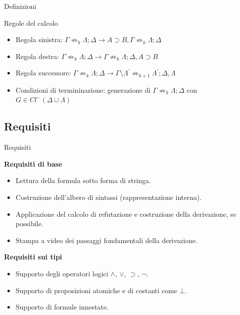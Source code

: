 \documentclass{beamer}
\begin{document}
\begin{darkframes}
    \begin{frame}{Definizioni}
        \begin{block}{Regole del calcolo}
            \begin{itemize}
                \item Regola sinistra: $\Gamma \not\Rightarrow_k \Lambda; \Delta \rightarrow A \supset B, \Gamma \not\Rightarrow_k \Lambda; \Delta$
                \item Regola destra: $\Gamma \not\Rightarrow_k \Lambda; \Delta \rightarrow \Gamma \not\Rightarrow_k \Lambda; \Delta, A \supset B$
                \item Regola successore: $\Gamma \not\Rightarrow_k \Lambda; \Delta \rightarrow \Gamma \setminus \Lambda^{'} \not\Rightarrow_{k+1} \Lambda^{'}; \Delta, \Lambda$
                \item Condizioni di termininazione: generazione di $\Gamma \not\Rightarrow_k \Lambda; \Delta$ con $G \in Cl^-(\Delta \cup \Lambda)$
            \end{itemize}
        \end{block}
    \end{frame}

    \subsection{Requisiti}
    \begin{frame}{Requisiti}

        \textbf{Requisiti di base}
        \begin{itemize}
            \item Lettura della formula sotto forma di stringa.
            \item Costruzione dell'albero di sintassi (rappresentazione interna).
            \item Applicazione del calcolo di refutazione e costruzione della derivazione, se possibile.
            \item Stampa a video dei passaggi fondamentali della derivazione.
        \end{itemize}

        \textbf{Requisiti sui tipi}
        \begin{itemize}
            \item Supporto degli operatori logici $\land$, $\lor$, $\supset$, $\neg$.
            \item Supporto di proposizioni atomiche e di costanti come $\bot$.
            \item Supporto di formule innestate.
        \end{itemize}


\end{frame}
\end{darkframes}
\end{document}

